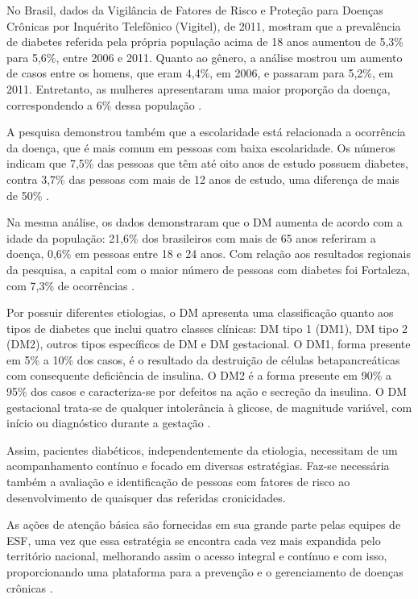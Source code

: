 No Brasil, dados da Vigilância de Fatores de Risco e Proteção para Doenças Crônicas por Inquérito Telefônico (Vigitel), de 2011, mostram que a prevalência de diabetes referida pela própria  população acima de 18 anos aumentou de 5,3\% para 5,6\%, entre 2006 e 2011. Quanto ao gênero, a análise mostrou um aumento de casos entre os homens, que eram 4,4\%, em 2006, e passaram para 5,2\%, em 2011. Entretanto, as mulheres apresentaram uma maior proporção da doença, correspondendo a 6\% dessa população \cite{monteiro2007vigitel}.

A pesquisa demonstrou também que a escolaridade está relacionada a ocorrência da doença, que é mais comum em pessoas com baixa escolaridade. Os números indicam que 7,5\% das pessoas que têm até oito anos de estudo possuem diabetes, contra 3,7\% das pessoas com mais de 12 anos de estudo, uma diferença de mais de 50\% \cite{monteiro2007vigitel}.

Na mesma análise, os dados demonstraram que o DM aumenta de acordo com a idade da população: 21,6\% dos brasileiros com mais de 65 anos referiram a doença, 0,6\% em pessoas entre 18 e 24 anos. Com relação aos resultados regionais da pesquisa, a capital com o maior número de pessoas com diabetes foi Fortaleza, com 7,3\% de ocorrências \cite{monteiro2007vigitel}.

Por possuir diferentes etiologias, o DM apresenta uma classificação quanto aos tipos de diabetes que inclui quatro classes clínicas: DM tipo 1 (DM1), DM tipo 2 (DM2), outros tipos específicos de DM e DM gestacional. O DM1, forma presente em 5\% a 10\% dos casos, é o resultado da destruição de células betapancreáticas com consequente deficiência de insulina. O DM2 é a forma presente em 90\% a 95\% dos casos e caracteriza-se por defeitos na ação e secreção da insulina. O DM gestacional trata-se de qualquer intolerância à glicose, de magnitude variável, com início ou diagnóstico durante a gestação \cite{sociedade2009diretrizes}.

Assim, pacientes diabéticos, independentemente da etiologia, necessitam de um acompanhamento contínuo e focado em diversas estratégias. Faz-se necessária também a avaliação e identificação de pessoas com fatores de risco ao desenvolvimento de quaisquer das referidas cronicidades. 

As ações de atenção básica são fornecidas em sua grande parte pelas equipes de ESF, uma vez que essa estratégia se encontra cada vez mais expandida pelo território nacional, melhorando assim o acesso integral e contínuo e com isso, proporcionando uma plataforma para a prevenção e o gerenciamento de doenças crônicas \cite{chor2011saude}.

